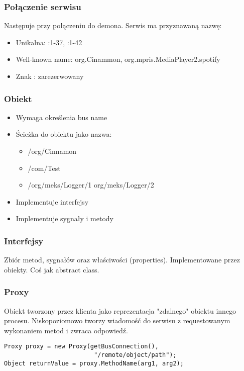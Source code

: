 \begin{frame}
    \frametitle{Połączenie serwisu}
    Następuje przy połączeniu do demona.
    Serwis ma przyznawaną nazwę:
    \begin{itemize}
        \item Unikalna: :1-37, :1-42
        \item Well-known name: org.Cinammon, org.mpris.MediaPlayer2.spotify
        \item Znak : zarezerwowany
    \end{itemize}
\end{frame}

\begin{frame}
    \frametitle{Obiekt}
    \begin{itemize}
        \item Wymaga określenia bus name
        \item Ścieżka do obiektu jako nazwa: 
        \begin{itemize}
            \item /org/Cinnamon 
            \item /com/Test
            \item /org/meks/Logger/1 org/meks/Logger/2
        \end{itemize}
        \item Implementuje interfejsy
        \item Implementuje sygnały i metody
    \end{itemize}
\end{frame}


\begin{frame}
    \frametitle{Interfejsy}
    Zbiór metod, sygnałów oraz właściwości (properties).
    Implementowane przez obiekty. 
    Coś jak abstract class.
\end{frame}

\begin{frame}[fragile]
    \frametitle{Proxy}
    Obiekt tworzony przez klienta jako reprezentacja
    "zdalnego" obiektu innego procesu. Niskopoziomowo tworzy
    wiadomość do serwisu z requestowanym wykonaniem metod i zwraca
    odpowiedź.

    \begin{flushleft}
        \begin{lstlisting}
Proxy proxy = new Proxy(getBusConnection(),
                         "/remote/object/path");
Object returnValue = proxy.MethodName(arg1, arg2);
        \end{lstlisting}      
    \end{flushleft}

\end{frame}


